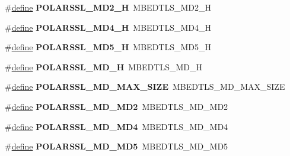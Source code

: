 \begin{DoxyCompactItemize}
\item 
\mbox{\label{compat-1_83_8h_a18d9b6cf073a4f231468ca702deddff8}} 
\#\hyperlink{structdefine}{define} {\bfseries P\+O\+L\+A\+R\+S\+S\+L\+\_\+\+M\+D2\+\_\+H}~M\+B\+E\+D\+T\+L\+S\+\_\+\+M\+D2\+\_\+H
\item 
\mbox{\label{compat-1_83_8h_a966bac979ed9d71082e156a8a1f178bb}} 
\#\hyperlink{structdefine}{define} {\bfseries P\+O\+L\+A\+R\+S\+S\+L\+\_\+\+M\+D4\+\_\+H}~M\+B\+E\+D\+T\+L\+S\+\_\+\+M\+D4\+\_\+H
\item 
\mbox{\label{compat-1_83_8h_ae65ff9309b311d5c29123ee1ddd0febc}} 
\#\hyperlink{structdefine}{define} {\bfseries P\+O\+L\+A\+R\+S\+S\+L\+\_\+\+M\+D5\+\_\+H}~M\+B\+E\+D\+T\+L\+S\+\_\+\+M\+D5\+\_\+H
\item 
\mbox{\label{compat-1_83_8h_ae291e97d37cfaf6c7bcd01b6d6f4d72c}} 
\#\hyperlink{structdefine}{define} {\bfseries P\+O\+L\+A\+R\+S\+S\+L\+\_\+\+M\+D\+\_\+H}~M\+B\+E\+D\+T\+L\+S\+\_\+\+M\+D\+\_\+H
\item 
\mbox{\label{compat-1_83_8h_a38c76a15d6a3874f898f3dc60750dde1}} 
\#\hyperlink{structdefine}{define} {\bfseries P\+O\+L\+A\+R\+S\+S\+L\+\_\+\+M\+D\+\_\+\+M\+A\+X\+\_\+\+S\+I\+ZE}~M\+B\+E\+D\+T\+L\+S\+\_\+\+M\+D\+\_\+\+M\+A\+X\+\_\+\+S\+I\+ZE
\item 
\mbox{\label{compat-1_83_8h_ae52b85cdf44adce4073e3cd8db8d3296}} 
\#\hyperlink{structdefine}{define} {\bfseries P\+O\+L\+A\+R\+S\+S\+L\+\_\+\+M\+D\+\_\+\+M\+D2}~M\+B\+E\+D\+T\+L\+S\+\_\+\+M\+D\+\_\+\+M\+D2
\item 
\mbox{\label{compat-1_83_8h_ac916a55f1d25aad39063d984832715cd}} 
\#\hyperlink{structdefine}{define} {\bfseries P\+O\+L\+A\+R\+S\+S\+L\+\_\+\+M\+D\+\_\+\+M\+D4}~M\+B\+E\+D\+T\+L\+S\+\_\+\+M\+D\+\_\+\+M\+D4
\item 
\mbox{\label{compat-1_83_8h_a788b1f9d91a76701eecbfd4e30467b4d}} 
\#\hyperlink{structdefine}{define} {\bfseries P\+O\+L\+A\+R\+S\+S\+L\+\_\+\+M\+D\+\_\+\+M\+D5}~M\+B\+E\+D\+T\+L\+S\+\_\+\+M\+D\+\_\+\+M\+D5
\item 
\mbox{\label{compat-1_83_8h_aa43a5b39851f0a09471be00055ea5074}} 

\end{DoxyCompactItemize}
